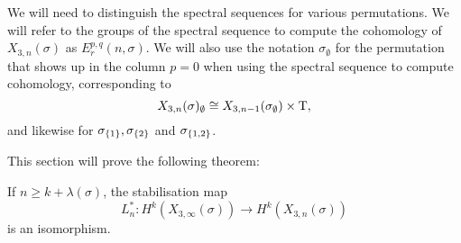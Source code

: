 We will need to distinguish the spectral sequences for various
permutations. We will refer to the groups of the spectral sequence to
compute the cohomology of $X_{3,n}(\sigma)$ as
$E_r^{p,q}(n,\sigma)$. We will also use the notation
$\sigma_{\emptyset}$ for the permutation that shows up in the
column $p=0$ when using the spectral sequence to compute cohomology,
corresponding to
\[X_{3,n}(\sigma)_{\emptyset} \cong
X_{3,n-1}(\sigma_{\emptyset})\times \operatorname{T},\]
and likewise for $\sigma_{\left\{ 1 \right\}},
\sigma_{\left\{ 2 \right\}}$ and $\sigma_{\left\{ 1,2 \right\}}$.

This section will prove the following theorem:
\begin{theorem}
  \label{thm:kostab}
  If $n \geq k + \lambda(\sigma)$, the stabilisation map
  \[ L_{n}^* : H^k(X_{3,\infty}(\sigma)) \to H^k(X_{3,n}(\sigma)) \]
  is an isomorphism.
\end{theorem}


